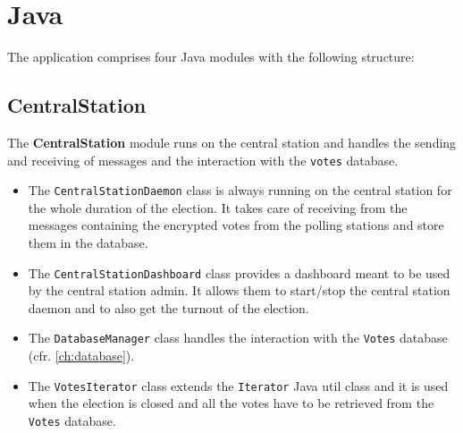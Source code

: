 %
\chapter{Java}\label{ch:java}
The application comprises four Java modules with the following structure:
\hfill \break
{}
\hfill \break

\section*{CentralStation}\label{sec:centralstation}
The \textbf{CentralStation} module runs on the central station and handles the sending and receiving of messages and the interaction with the \texttt{votes} database.\\
\begin{itemize}
	\item The \texttt{CentralStationDaemon} class is always running on the central station for the whole duration of the election. It takes care of receiving from the messages containing the encrypted votes from the polling stations and store them in the database.
	\item The \texttt{CentralStationDashboard} class provides a dashboard meant to be used by the central station admin. It allows them to start/stop the central station daemon and to also get the turnout of the election.
	\item The \texttt{DatabaseManager} class handles the interaction with the \texttt{Votes} database (cfr. \ref{ch:database}).\\
	\item The \texttt{VotesIterator} class extends the \texttt{Iterator} Java util class and it is used when the election is closed and all the votes have to be retrieved from the \texttt{Votes} database.\\
\end{itemize}

